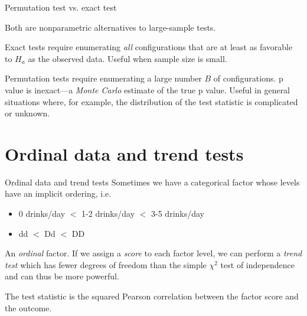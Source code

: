 \documentclass[serif,mathserif,professionalfonts]{beamer}
\begin{document}
\begin{frame}{Permutation test vs. exact test}

  Both are nonparametric alternatives to large-sample tests.

  Exact tests require enumerating \emph{all} configurations that are
  at least as favorable to $H_a$ as the observed data.  Useful when
  sample size is small.
  
  Permutation tests require enumerating a large number $B$ of
  configurations.  p value is inexact---a \emph{Monte Carlo} estimate
  of the true p value.  Useful in general situations where, for
  example, the distribution of the test statistic is complicated or
  unknown.

\end{frame}


\section{Ordinal data and trend tests}

\begin{frame}{Ordinal data and trend tests}
  Sometimes we have a categorical factor whose levels have an implicit
  ordering, i.e.
     \begin{itemize}
       \item 0 drinks/day $<$ 1-2 drinks/day $<$ 3-5 drinks/day
       \item dd $<$ Dd $<$ DD
     \end{itemize}
  An \emph{ordinal} factor.  If we assign a \emph{score} to each
  factor level, we can perform a \emph{trend test} which has
  fewer degrees of freedom than the simple $\chi^2$ test of
  independence and can thus be more powerful.

  The test statistic is the squared Pearson correlation between the
  factor score and the outcome.
\end{frame}
\end{document}
